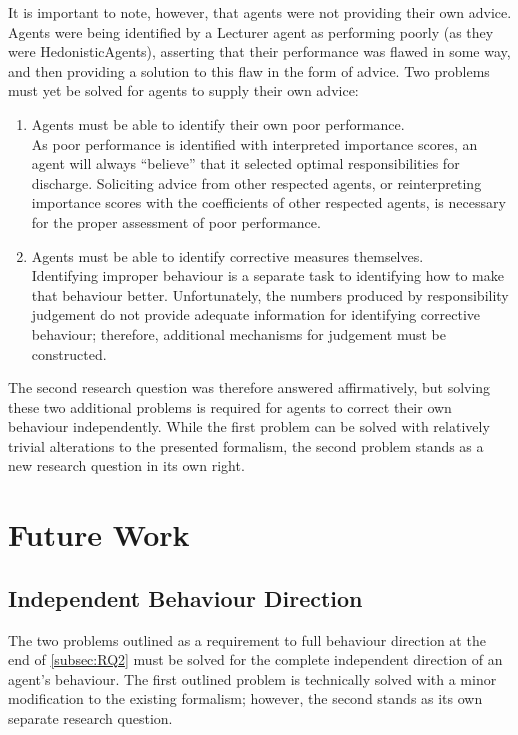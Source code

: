 It is important to note, however, that agents were not providing their own advice. Agents were being identified by a Lecturer agent as performing poorly (as they were HedonisticAgents), asserting that their performance was flawed in some way, and then providing a solution to this flaw in the form of advice. Two problems must yet be solved for agents to supply their own advice:

\begin{enumerate}
    \item Agents must be able to identify their own poor performance.\\
        As poor performance is identified with interpreted importance scores, an agent will always ``believe'' that it selected optimal responsibilities for discharge. Soliciting advice from other respected agents, or reinterpreting importance scores with the coefficients of other respected agents, is necessary for the proper assessment of poor performance.
    \item Agents must be able to identify corrective measures themselves.\\
        Identifying improper behaviour is a separate task to identifying how to make that behaviour better. Unfortunately, the numbers produced by responsibility judgement do not provide adequate information for identifying corrective behaviour; therefore, additional mechanisms for judgement must be constructed.
\end{enumerate}

The second research question was therefore answered affirmatively, but solving these two additional problems is required for agents to correct their own behaviour independently. While the first problem can be solved with relatively trivial alterations to the presented formalism, the second problem stands as a new research question in its own right.\par

\section{Future Work}\label{sec:future_work}

\subsection{Independent Behaviour Direction}
The two problems outlined as a requirement to full behaviour direction at the end of \cref{subsec:RQ2} must be solved for the complete independent direction of an agent's behaviour. The first outlined problem is technically solved with a minor modification to the existing formalism; however, the second stands as its own separate research question.\par

